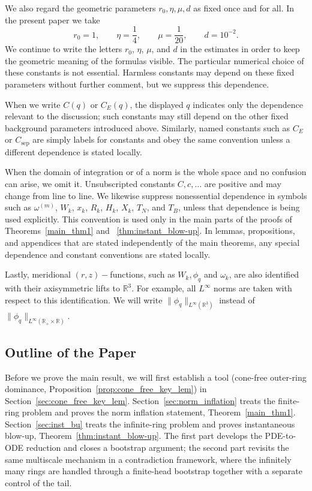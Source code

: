 \documentclass[reqno,11pt]{amsart}
\begin{document}
We also regard the geometric parameters $r_0,\eta,\mu,d$ as fixed once and for all. In the present paper we take
\[
    r_0=1,\qquad \eta=\frac14,\qquad \mu=\frac1{20},\qquad d=10^{-2}.
\]
We continue to write the letters $r_0$, $\eta$, $\mu$, and $d$ in the estimates in order to keep the geometric meaning of the formulas visible. The particular numerical choice of these constants is not essential. Harmless constants may depend on these fixed parameters without further comment, but we suppress this dependence.

When we write $C(q)$ or $C_E(q)$, the displayed $q$ indicates only the dependence relevant to the discussion; such constants may still depend on the other fixed background parameters introduced above. Similarly, named constants such as $C_E$ or $C_{\mathrm{sep}}$ are simply labels for constants and obey the same convention unless a different dependence is stated locally.

When the domain of integration or of a norm is the whole space and no confusion can arise, we omit it. Unsubscripted constants $C,c,\dots$ are positive and may change from line to line. We likewise suppress nonessential dependence in symbols such as $\omega^{(m)}$, $W_k$, $x_k$, $R_k$, $H_k$, $X_k$, $T_N$, and $T_B$, unless that dependence is being used explicitly. This convention is used only in the main parts of the proofs of Theorems~\ref{main_thm1} and ~\ref{thm:instant_blow-up}. In lemmas, propositions, and appendices that are stated independently of the main theorems, any special dependence and constant conventions are stated locally.

Lastly,  meridional $(r,z)-$functions, such as $W_k,\phi_q$ and $\omega_k$, are also identified with their axisymmetric lifts to $\mathbb{R}^3$. For example, all $L^\infty$ norms are taken with respect to this identification. We will write $\|\phi_q\|_{L^\infty(\mathbb{R}^3)}$ instead of $\|\phi_q\|_{L^\infty(\mathbb{R}_+\times \mathbb{R})}$.

\subsection{Outline of the Paper}

Before we prove the main result, we will first establish a tool (cone-free outer-ring dominance, Proposition~\ref{prop:cone_free_key_lem}) in Section~\ref{sec:cone_free_key_lem}.  Section~\ref{sec:norm_inflation} treats the finite-ring problem and proves the norm inflation statement, Theorem~\ref{main_thm1}. Section~\ref{sec:inst_bu} treats the infinite-ring problem and proves instantaneous blow-up, Theorem~\ref{thm:instant_blow-up}. The first part develops the PDE-to-ODE reduction and closes a bootstrap argument; the second part revisits the same multiscale mechanism in a contradiction framework, where the infinitely many rings are handled through a finite-head bootstrap together with a separate control of the tail.
\end{document}

